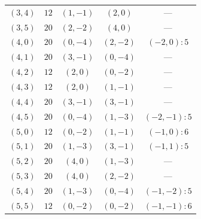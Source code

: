 {\begin{longtable}{ccccc}
$(3,4)$ & $12$ & $(1,-1)$ & $(2,0)$ & ---\\
$(3,5)$ & $20$ & $(2,-2)$ & $(4,0)$ & ---\\
\midrule
$(4,0)$ & $20$ & $(0,-4)$ & $(2,-2)$ & $(-2,0):5$\\
$(4,1)$ & $20$ & $(3,-1)$ & $(0,-4)$ & ---\\
$(4,2)$ & $12$ & $(2,0)$ & $(0,-2)$ & ---\\
$(4,3)$ & $12$ & $(2,0)$ & $(1,-1)$ & ---\\
$(4,4)$ & $20$ & $(3,-1)$ & $(3,-1)$ & ---\\
$(4,5)$ & $20$ & $(0,-4)$ & $(1,-3)$ & $(-2,-1):5$\\
\midrule
$(5,0)$ & $12$ & $(0,-2)$ & $(1,-1)$ & $(-1,0):6$\\
$(5,1)$ & $20$ & $(1,-3)$ & $(3,-1)$ & $(-1,1):5$\\
$(5,2)$ & $20$ & $(4,0)$ & $(1,-3)$ & ---\\
$(5,3)$ & $20$ & $(4,0)$ & $(2,-2)$ & ---\\
$(5,4)$ & $20$ & $(1,-3)$ & $(0,-4)$ & $(-1,-2):5$\\
$(5,5)$ & $12$ & $(0,-2)$ & $(0,-2)$ & $(-1,-1):6$\\
\end{longtable}
}

